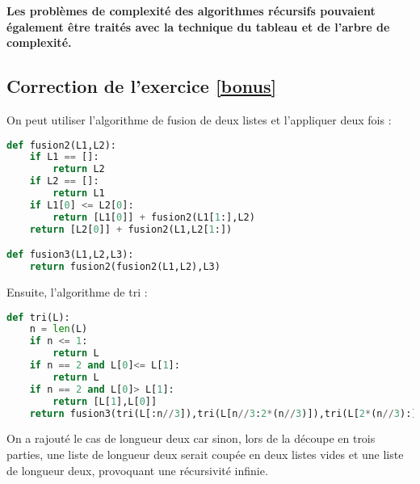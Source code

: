 \documentclass[11pt,a4paper]{article}
\begin{document}
\begin{center}
\textbf{Les problèmes de complexité des algorithmes récursifs pouvaient également être traités avec la technique du tableau et de l'arbre de complexité.}
\end{center}

\subsection*{Correction de l'exercice \ref{bonus}}

On peut utiliser l'algorithme de fusion de deux listes et l'appliquer deux fois :

\begin{lstlisting}[language=Python]
def fusion2(L1,L2):
	if L1 == []:
		return L2
	if L2 == []:
		return L1
	if L1[0] <= L2[0]:
		return [L1[0]] + fusion2(L1[1:],L2)
	return [L2[0]] + fusion2(L1,L2[1:])

def fusion3(L1,L2,L3):
	return fusion2(fusion2(L1,L2),L3)
\end{lstlisting}

Ensuite, l'algorithme de tri :
\begin{lstlisting}[language=Python]
def tri(L):
	n = len(L)
	if n <= 1:
		return L
	if n == 2 and L[0]<= L[1]:
		return L
	if n == 2 and L[0]> L[1]:
		return [L[1],L[0]]
	return fusion3(tri(L[:n//3]),tri(L[n//3:2*(n//3)]),tri(L[2*(n//3):]))
\end{lstlisting}
On a rajouté le cas de longueur deux car sinon, lors de la découpe en trois parties, une liste de longueur deux serait coupée en deux listes vides et une liste de longueur deux, provoquant une récursivité infinie.
\end{document}
